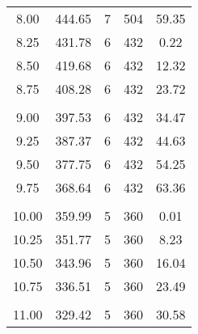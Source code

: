 \begin{table}[H]
{\begin{tabular}{ccccc}
            \\
            8.00                         & 444.65                     & 7                      & 504                            & 59.35                   \\
            8.25                         & 431.78                     & 6                      & 432                            & 0.22                    \\
            8.50                         & 419.68                     & 6                      & 432                            & 12.32                   \\
            8.75                         & 408.28                     & 6                      & 432                            & 23.72                   \\
            \\
            9.00                         & 397.53                     & 6                      & 432                            & 34.47                   \\
            9.25                         & 387.37                     & 6                      & 432                            & 44.63                   \\
            9.50                         & 377.75                     & 6                      & 432                            & 54.25                   \\
            9.75                         & 368.64                     & 6                      & 432                            & 63.36                   \\
            \\
            10.00                        & 359.99                     & 5                      & 360                            & 0.01                    \\
            10.25                        & 351.77                     & 5                      & 360                            & 8.23                    \\
            10.50                        & 343.96                     & 5                      & 360                            & 16.04                   \\
            10.75                        & 336.51                     & 5                      & 360                            & 23.49                   \\
            \\
            11.00                        & 329.42                     & 5                      & 360                            & 30.58                   \\

\end{tabular}}
\end{table}
